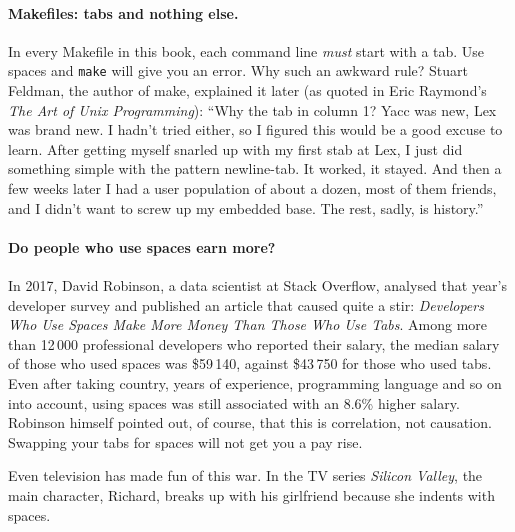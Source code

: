 \paragraph{Makefiles: tabs and nothing else.}
In every Makefile in this book, each command line \emph{must} start with a tab. Use spaces and \texttt{make} will give you an error. Why such an awkward rule? Stuart Feldman, the author of make, explained it later (as quoted in Eric Raymond's \emph{The Art of Unix Programming}): ``Why the tab in column 1? Yacc was new, Lex was brand new. I hadn't tried either, so I figured this would be a good excuse to learn. After getting myself snarled up with my first stab at Lex, I just did something simple with the pattern newline-tab. It worked, it stayed. And then a few weeks later I had a user population of about a dozen, most of them friends, and I didn't want to screw up my embedded base. The rest, sadly, is history.''

\paragraph{Do people who use spaces earn more?}
In 2017, David Robinson, a data scientist at Stack Overflow, analysed that year's developer survey and published an article that caused quite a stir: \emph{Developers Who Use Spaces Make More Money Than Those Who Use Tabs}. Among more than 12\,000 professional developers who reported their salary, the median salary of those who used spaces was \$59\,140, against \$43\,750 for those who used tabs. Even after taking country, years of experience, programming language and so on into account, using spaces was still associated with an 8.6\% higher salary. Robinson himself pointed out, of course, that this is correlation, not causation. Swapping your tabs for spaces will not get you a pay rise.

Even television has made fun of this war. In the TV series \emph{Silicon Valley}, the main character, Richard, breaks up with his girlfriend because she indents with spaces.

